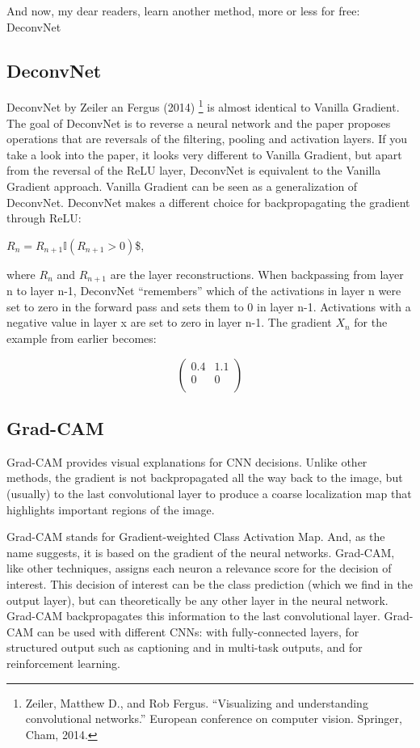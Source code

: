 \documentclass[12pt,]{krantz}
\begin{document}
And now, my dear readers, learn another method, more or less for free:
DeconvNet

\subsection{DeconvNet}\label{deconvnet}

DeconvNet by Zeiler an Fergus (2014) \footnote{Zeiler, Matthew D., and
  Rob Fergus. ``Visualizing and understanding convolutional networks.''
  European conference on computer vision. Springer, Cham, 2014.} is
almost identical to Vanilla Gradient. The goal of DeconvNet is to
reverse a neural network and the paper proposes operations that are
reversals of the filtering, pooling and activation layers. If you take a
look into the paper, it looks very different to Vanilla Gradient, but
apart from the reversal of the ReLU layer, DeconvNet is equivalent to
the Vanilla Gradient approach. Vanilla Gradient can be seen as a
generalization of DeconvNet. DeconvNet makes a different choice for
backpropagating the gradient through ReLU:

\(R_n=R_{n+1}\mathbb{I}(R_{n+1}>0)\)\$,

where \(R_n\) and \(R_{n+1}\) are the layer reconstructions. When
backpassing from layer n to layer n-1, DeconvNet ``remembers'' which of
the activations in layer n were set to zero in the forward pass and sets
them to 0 in layer n-1. Activations with a negative value in layer x are
set to zero in layer n-1. The gradient \(X_n\) for the example from
earlier becomes:

\[
\begin{pmatrix}
0.4 & 1.1 \\
0 & 0  \\
\end{pmatrix}
\]

\subsection{Grad-CAM}\label{grad-cam}

Grad-CAM provides visual explanations for CNN decisions. Unlike other
methods, the gradient is not backpropagated all the way back to the
image, but (usually) to the last convolutional layer to produce a coarse
localization map that highlights important regions of the image.

Grad-CAM stands for Gradient-weighted Class Activation Map. And, as the
name suggests, it is based on the gradient of the neural networks.
Grad-CAM, like other techniques, assigns each neuron a relevance score
for the decision of interest. This decision of interest can be the class
prediction (which we find in the output layer), but can theoretically be
any other layer in the neural network. Grad-CAM backpropagates this
information to the last convolutional layer. Grad-CAM can be used with
different CNNs: with fully-connected layers, for structured output such
as captioning and in multi-task outputs, and for reinforcement learning.
\end{document}
